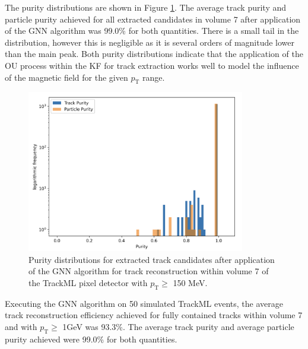 The purity distributions are shown in Figure \ref{fig:trackml-results-endcap-purity}. The average track purity and particle purity achieved for all extracted candidates in volume 7 after application of the GNN algorithm was 99.0\% for both quantities. There is a small tail in the distribution, however this is negligible as it is several orders of magnitude lower than the main peak. Both purity distributions indicate that the application of the OU process within the KF for track extraction works well to model the influence of the magnetic field for the given $p_{\text{T}}$ range.

\begin{figure}[htbp]
    \centering
    \includegraphics[width=0.85\textwidth]{images/7-results/endcap-purity-log.png}
    \caption{Purity distributions for extracted track candidates after application of the GNN algorithm for track reconstruction within volume 7 of the TrackML pixel detector with $p_{\text{T}} \geq$ 150 MeV.}
    \label{fig:trackml-results-endcap-purity}%
\end{figure}


Executing the GNN algorithm on 50 simulated TrackML events, the average track reconstruction efficiency achieved for fully contained tracks within volume 7 and with $p_{\text{T}} \geq$ 1GeV was 93.3\%. The average track purity and average particle purity achieved were 99.0\% for both quantities.








